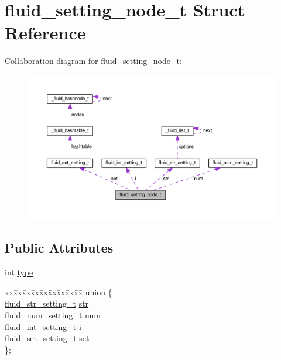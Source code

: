 \hypertarget{structfluid__setting__node__t}{}\section{fluid\+\_\+setting\+\_\+node\+\_\+t Struct Reference}
\label{structfluid__setting__node__t}


Collaboration diagram for fluid\+\_\+setting\+\_\+node\+\_\+t\+:
\nopagebreak
\begin{figure}[H]
\begin{center}
\leavevmode
\includegraphics[width=350pt]{structfluid__setting__node__t__coll__graph}
\end{center}
\end{figure}
\subsection*{Public Attributes}
\begin{DoxyCompactItemize}
\item 
int \hyperlink{structfluid__setting__node__t_ab4c71693974474f8f96a3dd44fd63882}{type}
\item 
\begin{tabbing}
xx\=xx\=xx\=xx\=xx\=xx\=xx\=xx\=xx\=\kill
union \{\\
\>\hyperlink{structfluid__str__setting__t}{fluid\_str\_setting\_t} \hyperlink{structfluid__setting__node__t_aa21d3a8f36b2d8ad7df4179d416dcba1}{str}\\
\>\hyperlink{structfluid__num__setting__t}{fluid\_num\_setting\_t} \hyperlink{structfluid__setting__node__t_aa5d78d5efbba856f9f13bea7215dd6a4}{num}\\
\>\hyperlink{structfluid__int__setting__t}{fluid\_int\_setting\_t} \hyperlink{structfluid__setting__node__t_a39c414072f7a20d82423bf972d34c3be}{i}\\
\>\hyperlink{structfluid__set__setting__t}{fluid\_set\_setting\_t} \hyperlink{structfluid__setting__node__t_a6d57fa7d8760b4d847a153eed01386b7}{set}\\
\}; \\

\end{tabbing}\end{DoxyCompactItemize}


